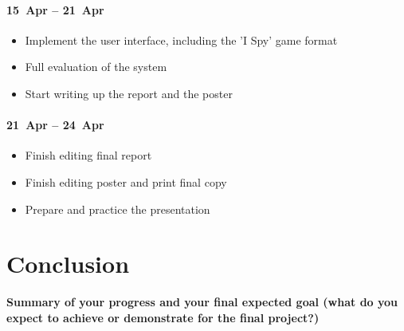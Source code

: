 \documentclass[11pt]{article}
\newcommand{\xxx}[1]{{\bf \color{red} #1}}
\begin{document}
\paragraph{15~Apr -- 21~Apr}
\begin{itemize}
\item Implement the user interface, including the 'I Spy' game format
\item Full evaluation of the system 
\item Start writing up the report and the poster
\end {itemize}

\paragraph{21~Apr -- 24~Apr}
\begin{itemize}
    \item Finish editing final report
    \item Finish editing poster and print final copy
\item Prepare and practice the presentation
\end{itemize}

\section{Conclusion}
\xxx{Summary of your progress and your final expected goal (what do you expect
    to achieve or demonstrate for the final project?)}



\end{document}
